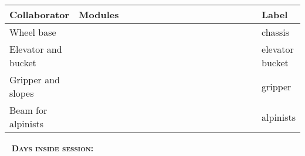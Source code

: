 	\begin{table}[H]
		\vspace{-2mm}
		\begin{center}
			\begin{tabular}{|p{0.2\linewidth}|p{0.7\linewidth}|p{0.1\linewidth}|}
				\hline
				Collaborator & Modules & Label \\
				\hline
				Wheel base &  & chassis \\
				\hline
				Elevator and bucket &  & elevator bucket \\
				\hline
				Gripper and slopes &  & gripper \\
				\hline
				Beam for alpinists &  & alpinists \\
				\hline
			\end{tabular}
		\end{center}
	\end{table}
  
   \newline
  \textsc{\textbf{Days inside session:}}
  
  
  
  
  
